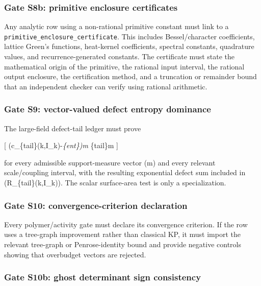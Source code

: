 \documentclass[
]{article}
\begin{document}
\subsubsection{Gate S8b: primitive enclosure
certificates}\label{gate-s8b-primitive-enclosure-certificates}

Any analytic row using a non-rational primitive constant must link to a
\texttt{primitive\_enclosure\_certificate}. This includes
Bessel/character coefficients, lattice Green's functions, heat-kernel
coefficients, spectral constants, quadrature values, and
recurrence-generated constants. The certificate must state the
mathematical origin of the primitive, the rational input interval, the
rational output enclosure, the certification method, and a truncation or
remainder bound that an independent checker can verify using rational
arithmetic.

\subsubsection{Gate S9: vector-valued defect entropy
dominance}\label{gate-s9-vector-valued-defect-entropy-dominance}

The large-field defect-tail ledger must prove

{[}
\left(\mathbf c\_\{\rm tail\}(k,I\_k)-\boldsymbol\mu\emph{\{\rm ent\}\right)\cdot\mathbf m
\ge\delta}\{\rm tail\}\textbar{}\mathbf m\textbar{} {]}

for every admissible support-measure vector (\mathbf m) and every
relevant scale/coupling interval, with the resulting exponential defect
sum included in (R\_\{\rm tail\}(k,I\_k)). The scalar surface-area test
is only a specialization.

\subsubsection{Gate S10: convergence-criterion
declaration}\label{gate-s10-convergence-criterion-declaration}

Every polymer/activity gate must declare its convergence criterion. If
the row uses a tree-graph improvement rather than classical KP, it must
import the relevant tree-graph or Penrose-identity bound and provide
negative controls showing that overbudget vectors are rejected.

\subsubsection{Gate S10b: ghost determinant sign
consistency}\label{gate-s10b-ghost-determinant-sign-consistency}
\end{document}
